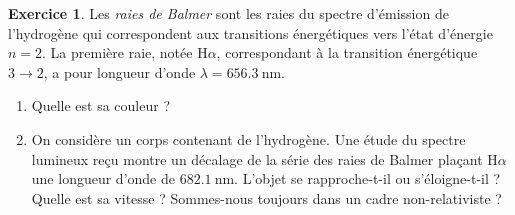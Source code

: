 \documentclass{article}
\theoremstyle{definition}
\newtheorem{exo}{Exercice}
\begin{document}
\begin{exo}
	Les \textit{raies de Balmer} sont les raies du spectre d'émission de l'hydrogène qui correspondent aux transitions énergétiques vers l'état d'énergie $n=2$. La première raie, notée H$\alpha$, correspondant à la transition énergétique $3\to 2$, a pour longueur d'onde $\lambda = \SI{656.3}{\nano\meter}$.
	
	\begin{enumerate}
		\item Quelle est sa couleur ?
		\item On considère un corps contenant de l'hydrogène. Une étude du spectre lumineux reçu montre un décalage de la série des raies de Balmer plaçant H$\alpha$ une longueur d'onde de $\SI{682.1}{\nano\meter} $. L'objet se rapproche-t-il ou s'éloigne-t-il ? Quelle est sa vitesse ? Sommes-nous toujours dans un cadre non-relativiste ?
	\end{enumerate}
\end{exo}
\end{document}
